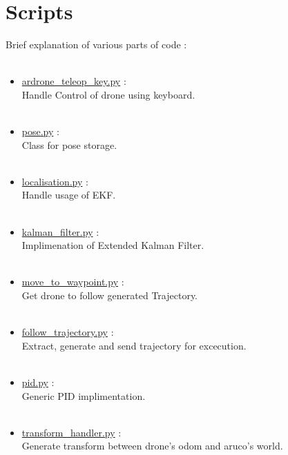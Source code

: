 \documentclass[a4paper,12pt,oneside]{book}
\begin{document}
\section{Scripts}
Brief explanation of various parts of code : \\\
\begin{itemize}
\item \href{https://github.com/eYSIP-2017/eYSIP-2017_Navigation-in-Indoor-Environments-using-drone/blob/master/scripts/ardrone_teleop_key.py}{ardrone\_teleop\_key.py} : \\
Handle Control of drone using keyboard.\\\

\item \href{https://github.com/eYSIP-2017/eYSIP-2017_Navigation-in-Indoor-Environments-using-drone/blob/master/scripts/pose.py}{pose.py} :\\
Class for pose storage.\\\

\item \href{https://github.com/eYSIP-2017/eYSIP-2017_Navigation-in-Indoor-Environments-using-drone/blob/master/scripts/localisation.py}{localisation.py} :\\
Handle usage of EKF.\\\

\item \href{https://github.com/eYSIP-2017/eYSIP-2017_Navigation-in-Indoor-Environments-using-drone/blob/master/scripts/kalman_filter.py}{kalman\_filter.py} :\\
Implimenation of Extended Kalman Filter.\\\

\item \href{https://github.com/eYSIP-2017/eYSIP-2017\_Navigation-in-Indoor-Environments-using-drone/blob/master/scripts/move\_to\_waypoint.py}{move\_to\_waypoint.py} :\\
Get drone to follow generated Trajectory.\\\

\item \href{https://github.com/eYSIP-2017/eYSIP-2017\_Navigation-in-Indoor-Environments-using-drone/blob/master/scripts/move\_to\_waypoint.py}{follow\_trajectory.py} :\\
Extract, generate and send trajectory for excecution.\\\

\item \href{https://github.com/eYSIP-2017/eYSIP-2017_Navigation-in-Indoor-Environments-using-drone/blob/master/scripts/pid.py}{pid.py} :\\
Generic PID implimentation.\\\

\item \href{https://github.com/eYSIP-2017/eYSIP-2017_Navigation-in-Indoor-Environments-using-drone/blob/master/scripts/transform_handler.py}{transform\_handler.py} :\\
Generate transform between drone's odom and aruco's world.\\\

\end{itemize}
\end{document}
